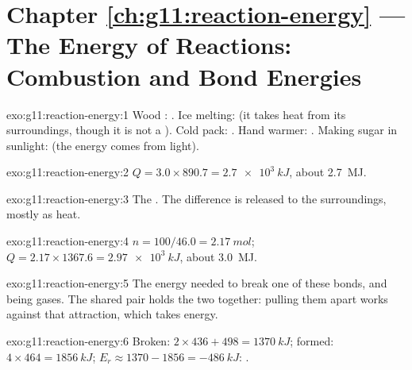 \section*{Chapter \ref{ch:g11:reaction-energy} --- The Energy of Reactions: Combustion and Bond Energies}

\begin{solution}{exo:g11:reaction-energy:1}
Wood : . Ice melting:  (it takes heat from
its surroundings, though it is not a ). Cold pack:
. Hand warmer: . Making sugar in sunlight:
 (the energy comes from light).
\end{solution}

\begin{solution}{exo:g11:reaction-energy:2}
$Q = 3.0 \times 890.7 = \qty{2.7e3}{kJ}$, about \qty{2.7}{MJ}.
\end{solution}

\begin{solution}{exo:g11:reaction-energy:3}
The . The difference is released to the surroundings, mostly as
heat.
\end{solution}

\begin{solution}{exo:g11:reaction-energy:4}
$n = 100 / 46.0 = \qty{2.17}{mol}$; $Q = 2.17 \times 1367.6 =
\qty{2.97e3}{kJ}$, about \qty{3.0}{MJ}.
\end{solution}

\begin{solution}{exo:g11:reaction-energy:5}
The energy needed to break one  of these bonds,  and 
being gases. The shared pair holds the two  together: pulling them
apart works against that attraction, which takes energy.
\end{solution}

\begin{solution}{exo:g11:reaction-energy:6}
Broken: $2 \times 436 + 498 = \qty{1370}{kJ}$; formed:
$4 \times 464 = \qty{1856}{kJ}$; $E_r \approx 1370 - 1856 =
\qty{-486}{kJ}$: .
\end{solution}

